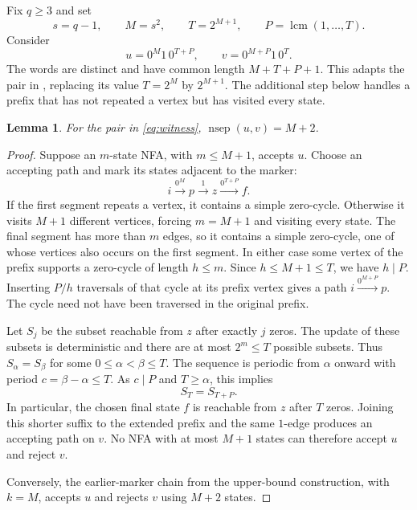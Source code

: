 \documentclass[11pt,a4paper]{article}
\newtheorem{lemma}[theorem]{Lemma}
\DeclareMathOperator{\nsep}{nsep}
\DeclareMathOperator{\lcm}{lcm}
\begin{document}
Fix \(q\geq3\) and set
\begin{equation}\label{eq:parameters}
 s=q-1,\qquad M=s^2,\qquad T=2^{M+1},
 \qquad P=\lcm(1,\ldots,T).
\end{equation}
Consider
\begin{equation}\label{eq:witness}
 u=0^M1\,0^{T+P},\qquad v=0^{M+P}1\,0^T.
\end{equation}
The words are distinct and have common length \(M+T+P+1\).
This adapts the pair in \cite[Theorem~6]{nicol2026}, replacing
its value \(T=2^M\) by \(2^{M+1}\). The additional step below handles
a prefix that has not repeated a vertex but has visited every state.

\begin{lemma}\label{lem:hard}
For the pair in \eqref{eq:witness}, \(\nsep(u,v)=M+2\).
\end{lemma}
\begin{proof}
Suppose an \(m\)-state NFA, with \(m\leq M+1\), accepts \(u\).
Choose an accepting path and mark its states adjacent to the marker:
\[
 i\overset{0^M}{\longrightarrow}p\overset{1}{\longrightarrow}z
      \overset{0^{T+P}}{\longrightarrow}f.
\]
If the first segment repeats a vertex, it contains a simple zero-cycle.
Otherwise it visits \(M+1\) different vertices, forcing \(m=M+1\)
and visiting every state. The final segment has more than \(m\) edges,
so it contains a simple zero-cycle, one of whose vertices also occurs
on the first segment. In either case some vertex of the prefix supports
a zero-cycle of length \(h\leq m\).
Since \(h\leq M+1\leq T\), we have \(h\mid P\).
Inserting \(P/h\) traversals of that cycle at its prefix vertex
gives a path \(i\overset{0^{M+P}}{\longrightarrow}p\).
The cycle need not have been traversed in the original prefix.

Let \(S_j\) be the subset reachable from \(z\) after exactly \(j\) zeros.
The update of these subsets is deterministic and there are at most
\(2^m\leq T\) possible subsets. Thus \(S_\alpha=S_\beta\) for some
\(0\leq\alpha<\beta\leq T\). The sequence is periodic from \(\alpha\)
onward with period \(c=\beta-\alpha\leq T\).
As \(c\mid P\) and \(T\geq\alpha\), this implies
\[
 S_T=S_{T+P}.
\]
In particular, the chosen final state \(f\) is reachable from \(z\)
after \(T\) zeros. Joining this shorter suffix to the extended prefix
and the same \(1\)-edge produces an accepting path on \(v\).
No NFA with at most \(M+1\) states can therefore accept \(u\) and reject \(v\).

Conversely, the earlier-marker chain from the upper-bound construction,
with \(k=M\), accepts \(u\) and rejects \(v\) using \(M+2\) states.
\end{proof}
\end{document}
